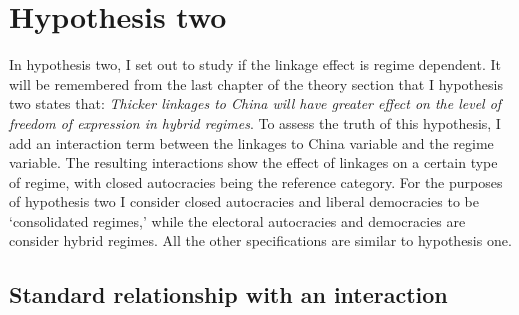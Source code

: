 \section{Hypothesis two} \label{sec:h2}
In hypothesis two, I set out to study if the linkage effect is regime dependent. It will be remembered from the last chapter of the theory section that I hypothesis two states that: \textit{Thicker linkages to China will have greater effect on the level of freedom of expression in hybrid regimes}. To assess the truth of this hypothesis, I add an interaction term between the linkages to China variable and the regime variable. The resulting interactions show the effect of linkages on a certain type of regime, with closed autocracies being the reference category. For the purposes of hypothesis two I consider closed autocracies and liberal democracies to be `consolidated regimes,' while the electoral autocracies and democracies are consider hybrid regimes. All the other specifications are similar to hypothesis one. 

\subsection{Standard relationship with an interaction}

